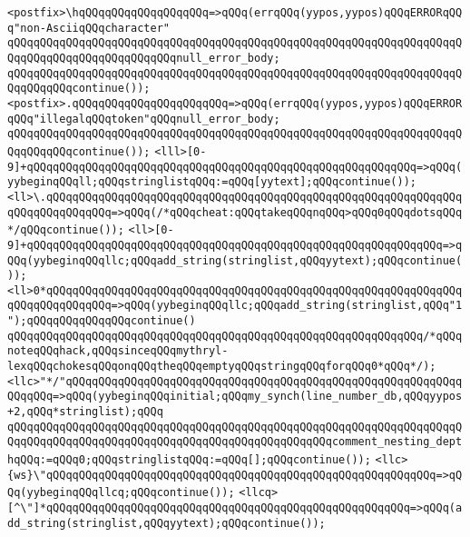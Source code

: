 \verb|<postfix>\hqQQqqQQqqQQqqQQqqQQq=>qQQq(errqQQq(yypos,yypos)qQQqERRORqQQq"non-AsciiqQQqcharacter"|\newline
\verb|qQQqqQQqqQQqqQQqqQQqqQQqqQQqqQQqqQQqqQQqqQQqqQQqqQQqqQQqqQQqqQQqqQQqqQQqqQQqqQQqqQQqqQQqqQQqqQQqnull_error_body;|\newline
\verb|qQQqqQQqqQQqqQQqqQQqqQQqqQQqqQQqqQQqqQQqqQQqqQQqqQQqqQQqqQQqqQQqqQQqqQQqqQQqqQQqcontinue());|\newline
\verb|<postfix>.qQQqqQQqqQQqqQQqqQQqqQQq=>qQQq(errqQQq(yypos,yypos)qQQqERRORqQQq"illegalqQQqtoken"qQQqnull_error_body;|\newline
\verb|qQQqqQQqqQQqqQQqqQQqqQQqqQQqqQQqqQQqqQQqqQQqqQQqqQQqqQQqqQQqqQQqqQQqqQQqqQQqqQQqcontinue());|\newline
\newline
\newline
\verb|<lll>[0-9]+qQQqqQQqqQQqqQQqqQQqqQQqqQQqqQQqqQQqqQQqqQQqqQQqqQQqqQQqqQQq=>qQQq(yybeginqQQqll;qQQqstringlistqQQq:=qQQq[yytext];qQQqcontinue());|\newline
\verb|<ll>\.qQQqqQQqqQQqqQQqqQQqqQQqqQQqqQQqqQQqqQQqqQQqqQQqqQQqqQQqqQQqqQQqqQQqqQQqqQQqqQQq=>qQQq(/*qQQqcheat:qQQqtakeqQQqnqQQq>qQQq0qQQqdotsqQQq*/qQQqcontinue());|\newline
\verb|<ll>[0-9]+qQQqqQQqqQQqqQQqqQQqqQQqqQQqqQQqqQQqqQQqqQQqqQQqqQQqqQQqqQQqqQQq=>qQQq(yybeginqQQqllc;qQQqadd_string(stringlist,qQQqyytext);qQQqcontinue());|\newline
\verb|<ll>0*qQQqqQQqqQQqqQQqqQQqqQQqqQQqqQQqqQQqqQQqqQQqqQQqqQQqqQQqqQQqqQQqqQQqqQQqqQQqqQQq=>qQQq(yybeginqQQqllc;qQQqadd_string(stringlist,qQQq"1");qQQqqQQqqQQqqQQqcontinue()|\newline
\verb|qQQqqQQqqQQqqQQqqQQqqQQqqQQqqQQqqQQqqQQqqQQqqQQqqQQqqQQqqQQqqQQq/*qQQqnoteqQQqhack,qQQqsinceqQQqmythryl-lexqQQqchokesqQQqonqQQqtheqQQqemptyqQQqstringqQQqforqQQq0*qQQq*/);|\newline
\verb|<llc>"*/"qQQqqQQqqQQqqQQqqQQqqQQqqQQqqQQqqQQqqQQqqQQqqQQqqQQqqQQqqQQqqQQqqQQq=>qQQq(yybeginqQQqinitial;qQQqmy_synch(line_number_db,qQQqyypos+2,qQQq*stringlist);qQQq|\newline
\verb|qQQqqQQqqQQqqQQqqQQqqQQqqQQqqQQqqQQqqQQqqQQqqQQqqQQqqQQqqQQqqQQqqQQqqQQqqQQqqQQqqQQqqQQqqQQqqQQqqQQqqQQqqQQqqQQqqQQqqQQqcomment_nesting_depthqQQq:=qQQq0;qQQqstringlistqQQq:=qQQq[];qQQqcontinue());|\newline
\verb|<llc>{ws}\"qQQqqQQqqQQqqQQqqQQqqQQqqQQqqQQqqQQqqQQqqQQqqQQqqQQqqQQqqQQq=>qQQq(yybeginqQQqllcq;qQQqcontinue());|\newline
\verb|<llcq>[^\"]*qQQqqQQqqQQqqQQqqQQqqQQqqQQqqQQqqQQqqQQqqQQqqQQqqQQqqQQq=>qQQq(add_string(stringlist,qQQqyytext);qQQqcontinue());|\newline

